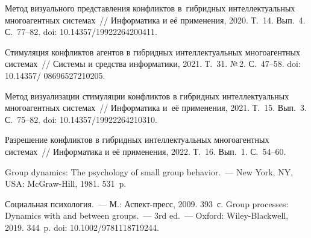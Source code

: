 \begin{multicols}{2}
{{\begin{thebibliography}{99}
 Метод визуального представления конфликтов 
в~гибридных интеллектуальных многоагентных сис\-те\-мах~// Информатика и её 
применения, 2020. Т.~14. Вып.~4. С.~77--82. doi: 10.14357/19922264200411.

 Стимуляция конфликтов агентов в гибридных 
интеллектуальных многоагентных сис\-те\-мах~// Сис\-те\-мы и средства информатики, 2021. 
Т.~31. №\,2. С.~47--58. doi: 10.14357/ 08696527210205.


 Метод визуализации стимуляции конфликтов в 
гибридных интеллектуальных многоагентных сис\-те\-мах~// Информатика и~её применения, 
2021. Т.~15. Вып.~3. С.~75--82. doi: 10.14357/19922264210310.

 Разрешение конфликтов в гибридных 
интеллектуальных многоагентных сис\-те\-мах~// Информатика и её применения, 2022. 
Т.~16. Вып.~1. С.~54--60.

 Group dynamics: The psychology of small group behavior.~--- New York, NY, 
USA: McGraw-Hill, 1981. 531~p.

 Социальная психология.~--- М.: Аспект-пресс, 2009. 393~с.
 Group processes: Dynamics with and between groups.~--- 3rd ed.~--- 
Oxford: Wiley-Blackwell, 2019. 344~p. doi: 10.1002/9781118719244.


\end{thebibliography}}}
\end{multicols}
